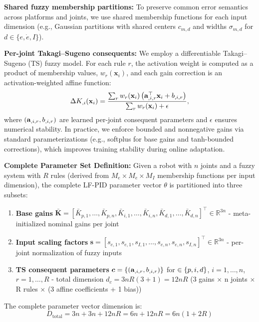 \documentclass[a4paper]{cas-sc}
\begin{document}
    \textbf{Shared fuzzy membership partitions:} To preserve common error semantics across platforms and joints, we use shared membership functions for each input dimension (e.g., Gaussian partitions with shared centers $c_{m,d}$ and widths $\sigma_{m,d}$ for $d \in \{e,\dot e,I\}$).

    \textbf{Per-joint Takagi--Sugeno consequents:} We employ a differentiable Takagi--Sugeno (TS) fuzzy model. For each rule $r$, the activation weight is computed as a product of membership values, $w_r(\mathbf{x}_i)$, and each gain correction is an activation-weighted affine function:
\begin{equation}
    \Delta K_{\*,i}(\mathbf{x}_i) = \frac{\sum_{r} w_r(\mathbf{x}_i)\,\big(\mathbf{a}_{\*,i,r}^\top\mathbf{x}_i + b_{\*,i,r}\big)}{\sum_{r} w_r(\mathbf{x}_i) + \epsilon},
\end{equation}
where $(\mathbf{a}_{\*,i,r}, b_{\*,i,r})$ are learned per-joint consequent parameters and $\epsilon$ ensures numerical stability. In practice, we enforce bounded and nonnegative gains via standard parameterizations (e.g., softplus for base gains and tanh-bounded corrections), which improves training stability during online adaptation.

\textbf{Complete Parameter Set Definition:} Given a robot with $n$ joints and a fuzzy system with $R$ rules (derived from $M_e \times M_{\dot e} \times M_I$ membership functions per input dimension), the complete LF-PID parameter vector $\theta$ is partitioned into three subsets:
\begin{enumerate}[leftmargin=*, itemsep=2pt]
    \item \textbf{Base gains} $\bar{\bm{K}} = [\bar{K}_{p,1},\ldots,\bar{K}_{p,n}, \bar{K}_{i,1},\ldots,\bar{K}_{i,n}, \bar{K}_{d,1},\ldots,\bar{K}_{d,n}]^\top \in \mathbb{R}^{3n}$ - meta-initialized nominal gains per joint
    \item \textbf{Input scaling factors} $\bm{s} = [s_{e,1}, s_{\dot e,1}, s_{I,1}, \ldots, s_{e,n}, s_{\dot e,n}, s_{I,n}]^\top \in \mathbb{R}^{3n}$ - per-joint normalization of fuzzy inputs
    \item \textbf{TS consequent parameters} $\bm{c} = \{(\mathbf{a}_{\*,i,r}, b_{\*,i,r})\}$ for $\* \in \{p,i,d\}$, $i=1,\ldots,n$, $r=1,\ldots,R$ - total dimension $d_c = 3nR(3+1) = 12nR$ (3 gains $\times$ n joints $\times$ R rules $\times$ (3 affine coefficients + 1 bias))
\end{enumerate}

The complete parameter vector dimension is:
\begin{equation}
    D_{\text{total}} = 3n + 3n + 12nR = 6n + 12nR = 6n(1 + 2R)
\end{equation}
\end{document}

